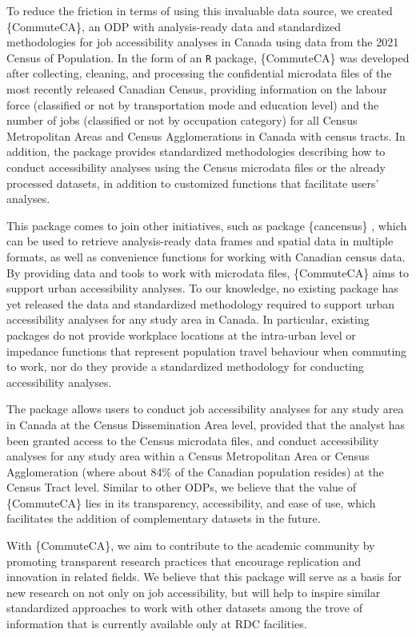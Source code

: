 \documentclass[sn-basic,lineno,pdflatex]{sn-jnl}
\begin{document}
To reduce the friction in terms of using this invaluable data source, we
created \{CommuteCA\}, an ODP with analysis-ready data and standardized
methodologies for job accessibility analyses in Canada using data from
the 2021 Census of Population. In the form of an \texttt{R} package,
\{CommuteCA\} was developed after collecting, cleaning, and processing
the confidential microdata files of the most recently released Canadian
Census, providing information on the labour force (classified or not by
transportation mode and education level) and the number of jobs
(classified or not by occupation category) for all Census Metropolitan
Areas and Census Agglomerations in Canada with census tracts. In
addition, the package provides standardized methodologies describing how
to conduct accessibility analyses using the Census microdata files or
the already processed datasets, in addition to customized functions that
facilitate users' analyses.

This package comes to join other initiatives, such as package
\{cancensus\} \citep{cancensus}, which can be used to retrieve
analysis-ready data frames and spatial data in multiple formats, as well
as convenience functions for working with Canadian census data. By
providing data and tools to work with microdata files, \{CommuteCA\}
aims to support urban accessibility analyses. To our knowledge, no
existing package has yet released the data and standardized methodology
required to support urban accessibility analyses for any study area in
Canada. In particular, existing packages do not provide workplace
locations at the intra-urban level or impedance functions that represent
population travel behaviour when commuting to work, nor do they provide
a standardized methodology for conducting accessibility analyses.

The package allows users to conduct job accessibility analyses for any
study area in Canada at the Census Dissemination Area level, provided
that the analyst has been granted access to the Census microdata files,
and conduct accessibility analyses for any study area within a Census
Metropolitan Area or Census Agglomeration (where about 84\% of the
Canadian population resides) at the Census Tract level. Similar to other
ODPs, we believe that the value of \{CommuteCA\} lies in its
transparency, accessibility, and ease of use, which facilitates the
addition of complementary datasets in the future.

With \{CommuteCA\}, we aim to contribute to the academic community by
promoting transparent research practices that encourage replication and
innovation in related fields. We believe that this package will serve as
a basis for new research on not only on job accessibility, but will help
to inspire similar standardized approaches to work with other datasets
among the trove of information that is currently available only at RDC
facilities.
\end{document}
